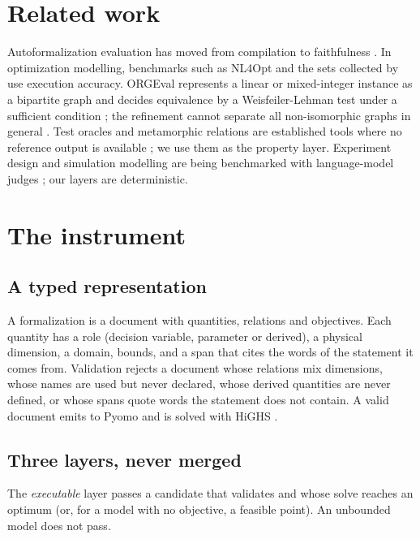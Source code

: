 \documentclass[journal]{IEEEtran}
\begin{document}
\section{Related work}

Autoformalization evaluation has moved from compilation to faithfulness \cite{lean2026,common2025}.
In optimization modelling, benchmarks such as NL4Opt \cite{nl4opt2023} and the sets collected by
\cite{survey2025} use execution accuracy. ORGEval represents a linear or mixed-integer instance as a
bipartite graph and decides equivalence by a Weisfeiler-Lehman test under a sufficient condition
\cite{orgeval2025,shervashidze2011}; the refinement cannot separate all non-isomorphic graphs in
general \cite{cfi1992}. Test oracles and metamorphic relations are established tools where no
reference output is available \cite{barr2015,segura2016}; we use them as the property layer.
Experiment design and simulation modelling are being benchmarked with language-model judges
\cite{scope2026,beams2026}; our layers are deterministic.

\section{The instrument}\label{sec:instrument}

\subsection{A typed representation}

A formalization is a document with quantities, relations and objectives. Each quantity has a role
(decision variable, parameter or derived), a physical dimension, a domain, bounds, and a span that
cites the words of the statement it comes from. Validation rejects a document whose relations mix
dimensions, whose names are used but never declared, whose derived quantities are never defined, or
whose spans quote words the statement does not contain. A valid document emits to Pyomo
\cite{pyomo} and is solved with HiGHS \cite{highs}.

\subsection{Three layers, never merged}

The \emph{executable} layer passes a candidate that validates and whose solve reaches an optimum
(or, for a model with no objective, a feasible point). An unbounded model does not pass.
\end{document}
